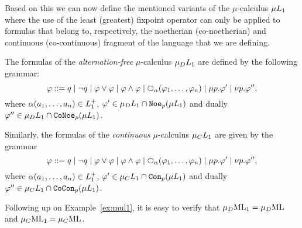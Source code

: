 Based on this we can now define the mentioned variants 
of the $\mu$-calculus $\mu L_{1}$ where the use of the least (greatest) 
fixpoint operator can only be applied to formulas that belong to, 
respectively, the noetherian (co-noetherian) and continuous (co-continuous)
fragment of the language that we are defining.

\begin{definition}
The formulas of the \emph{alternation-free} $\mu$-calculus $\mu_{D}L_{1}$ 
are defined by the following grammar:
\begin{equation*}
   \varphi \isbnf  
      q \mid \neg q 
   \mid \varphi\lor\varphi \mid \varphi\land\varphi 
   \mid \nxt{\al}(\varphi_{1},\ldots,\varphi_{n})
   \mid \mu p. \varphi'    
   \mid \nu p. \varphi'',
\end{equation*} 
where $\alpha(a_{1},\ldots,a_{n}) \in L_{1}^{+}$,
$\varphi' \in \mu_{D}L_{1} \cap \mathtt{Noe}_{p}(\mu L_{1})$
and dually $\varphi'' \in \mu_{D}L_{1} \cap \mathtt{CoNoe}_{p}(\mu L_{1})$.

Similarly, the formulas of the \emph{continuous} $\mu$-calculus $\mu_{C}L_{1}$
are given by the grammar
\begin{equation*}
   \varphi \isbnf  
      q \mid \neg q 
   \mid \varphi\lor\varphi \mid \varphi\land\varphi 
   \mid \nxt{\al}(\varphi_{1},\ldots,\varphi_{n})
   \mid \mu p. \varphi'    
   \mid \nu p. \varphi'',
\end{equation*} 
where $\alpha(a_{1},\ldots,a_{n}) \in L_{1}^{+}$,
$\varphi' \in \mu_{C}L_{1} \cap \mathtt{Con}_{p}(\mu L_{1})$
and dually $\varphi'' \in \mu_{C}L_{1} \cap \mathtt{CoCon}_{p}(\mu L_{1})$.
\end{definition}

\begin{example}
Following up on Example~\ref{ex:mul1}, it is easy to verify that 
$\mu_{D}\mathrm{ML}_1 = \mu_{D}\mathrm{ML}$ and $\mu_{C}\mathrm{ML}_1 = \mu_{C}\mathrm{ML}$.
\end{example}
